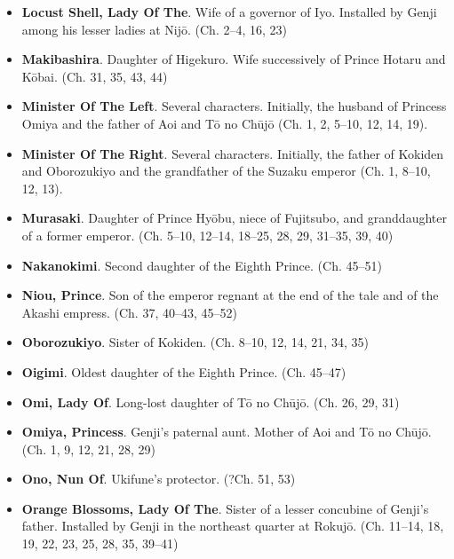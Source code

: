 \documentclass{article}
\begin{document}
\begin{multicols}{2}
\begin{small}
\begin{itemize}[
			label=,
			leftmargin=0em,
			rightmargin=-1.5em,
			itemindent=-2em,
			nosep,
		]
		\item \textbf{Locust Shell, Lady Of The}. Wife of a governor of Iyo. Installed by Genji among his lesser ladies at Nijō. (Ch. 2--4, 16, 23)

		\item \textbf{Makibashira}. Daughter of Higekuro. Wife successively of Prince Hotaru and Kōbai. (Ch. 31, 35, 43, 44)

		\item \textbf{Minister Of The Left}. Several characters. Initially, the husband of Princess Omiya and the father of Aoi and Tō no Chūjō (Ch. 1, 2, 5--10, 12, 14, 19).

		\item \textbf{Minister Of The Right}. Several characters. Initially, the father of Kokiden and Oborozukiyo and the grandfather of the Suzaku emperor (Ch. 1, 8--10, 12, 13).

		\item \textbf{Murasaki}. Daughter of Prince Hyōbu, niece of Fujitsubo, and granddaughter of a former emperor. (Ch. 5--10, 12--14, 18--25, 28, 29, 31--35, 39, 40)

		\item \textbf{Nakanokimi}. Second daughter of the Eighth Prince. (Ch. 45--51)

		\item \textbf{Niou, Prince}. Son of the emperor regnant at the end of the tale and of the Akashi empress. (Ch. 37, 40--43, 45--52)

		\item \textbf{Oborozukiyo}. Sister of Kokiden. (Ch. 8--10, 12, 14, 21, 34, 35)

		\item \textbf{Oigimi}. Oldest daughter of the Eighth Prince. (Ch. 45--47)
		
		\item \textbf{Omi, Lady Of}. Long-lost daughter of Tō no Chūjō. (Ch. 26, 29, 31)

		\item \textbf{Omiya, Princess}. Genji's paternal aunt. Mother of Aoi and Tō no Chūjō. (Ch. 1, 9, 12, 21, 28, 29)

		\item \textbf{Ono, Nun Of}. Ukifune's protector. (?Ch. 51, 53)

		\item \textbf{Orange Blossoms, Lady Of The}. Sister of a lesser concubine of Genji's father. Installed by Genji in the northeast quarter at Rokujō. (Ch. 11--14, 18, 19, 22, 23, 25, 28, 35, 39--41)


\end{itemize}
\end{small}
\end{multicols}
\end{document}
